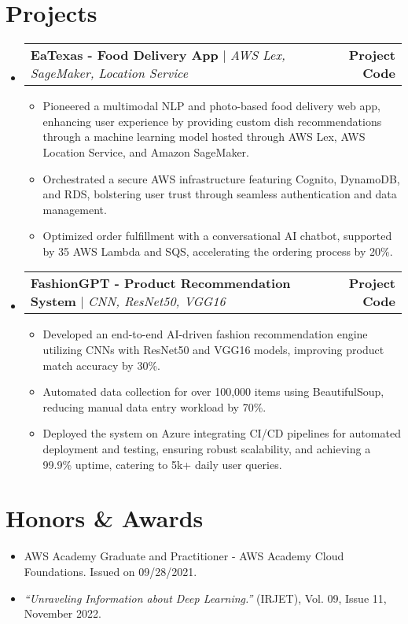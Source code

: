 \documentclass[letterpaper,10pt]{article} %
\makeatletter
\newcommand{\resumeItem}[1]{
  \item\small{
    {#1 \vspace{-2pt}}
  }
}
\newcommand{\resumeProjectHeading}[2]{
    \item
    \begin{tabular*}{1.001\textwidth}{l@{\extracolsep{\fill}}r}
      \small#1 & \textbf{\small #2} \\
    \end{tabular*}\vspace{-5pt}
}
\newcommand{\resumeSubHeadingListStart}{\begin{itemize}[leftmargin=0.0in, label={}]}
\newcommand{\resumeSubHeadingListEnd}{\end{itemize}}
\newcommand{\resumeItemListStart}{\justify \begin{itemize} \vspace{-3pt}} %
\newcommand{\resumeItemListEnd}{\end{itemize}\vspace{-3pt}}
\makeatother
\begin{document}
\section{Projects}
    \resumeSubHeadingListStart
        \resumeProjectHeading
            {\textbf{EaTexas - Food Delivery App} $|$ \emph{AWS Lex, SageMaker, Location Service}}{Project Code}
            \resumeItemListStart
                \resumeItem{Pioneered a multimodal NLP and photo-based food delivery web app, enhancing user experience by providing custom dish recommendations through a machine learning model hosted through AWS Lex, AWS Location Service, and Amazon SageMaker.}
                \resumeItem{Orchestrated a secure AWS infrastructure featuring Cognito, DynamoDB, and RDS, bolstering user trust through seamless authentication and data management.}
                \resumeItem{Optimized order fulfillment with a conversational AI chatbot, supported by 35 AWS Lambda and SQS, accelerating the ordering process by 20\%.}
            \resumeItemListEnd
            
        \resumeProjectHeading
            {\textbf{FashionGPT - Product Recommendation System} $|$ \emph{CNN, ResNet50, VGG16}}{Project Code}
            \resumeItemListStart
                \resumeItem{Developed an end-to-end AI-driven fashion recommendation engine utilizing CNNs with ResNet50 and VGG16 models, improving product match accuracy by 30\%.}
                \resumeItem{Automated data collection for over 100,000 items using BeautifulSoup, reducing manual data entry workload by 70\%.}
                \resumeItem{Deployed the system on Azure integrating CI/CD pipelines for automated deployment and testing, ensuring robust scalability, and achieving a 99.9\% uptime, catering to 5k+ daily user queries.}
            \resumeItemListEnd
    \resumeSubHeadingListEnd

\section{Honors \& Awards}
 \begin{itemize}[leftmargin=0.15in, label={}]
    \item{AWS Academy Graduate and Practitioner - AWS Academy Cloud Foundations. Issued on 09/28/2021.}
    \item{\textit{“Unraveling Information about Deep Learning.”} (IRJET), Vol. 09, Issue 11, November 2022.}
 \end{itemize}
\end{document}
